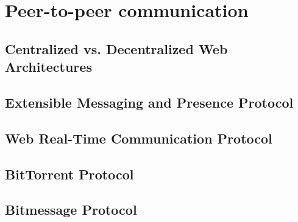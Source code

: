 
\section{Peer-to-peer communication}
\label{sec:p2p_communication}

\subsection{Centralized vs. Decentralized Web Architectures}
\label{sec:central_decentral_arch}


\subsection{Extensible Messaging and Presence Protocol}
\label{sec:p2p_xmpp}


\subsection{Web Real-Time Communication Protocol}
\label{sec:p2p_webrtc}


\subsection{BitTorrent Protocol}
\label{sec:p2p_bittorrent}


\subsection{Bitmessage Protocol}
\label{sec:p2p_bitmessage}


